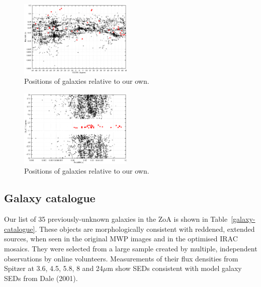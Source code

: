 \documentclass[times,usenatbib]{mn2e}
\begin{document}
\begin{figure}
\includegraphics[width=0.48\textwidth]{./figures/2MRS_zlon.eps}
\caption{Positions of galaxies relative to our own.}
\label{2mrsz}
\end{figure}

\begin{figure}
\includegraphics[width=0.48\textwidth]{./figures/2MRS_zlat.eps}
\caption{Positions of galaxies relative to our own.}
\label{2mrsz2}
\end{figure}

\subsection{Galaxy catalogue}
 
 Our list of 35 previously-unknown galaxies in the ZoA is shown in Table~\ref{galaxy-catalogue}. These objects are morphologically consistent with reddened, extended sources, when seen in the original MWP images and in the optimised IRAC mosaics. They were selected from a large sample created by multiple, independent observations by online volunteers. Measurements of their flux densities from Spitzer at 3.6, 4.5, 5.8, 8 and 24$\mu$m show SEDs consistent with model galaxy SEDs from Dale (2001).
\end{document}
